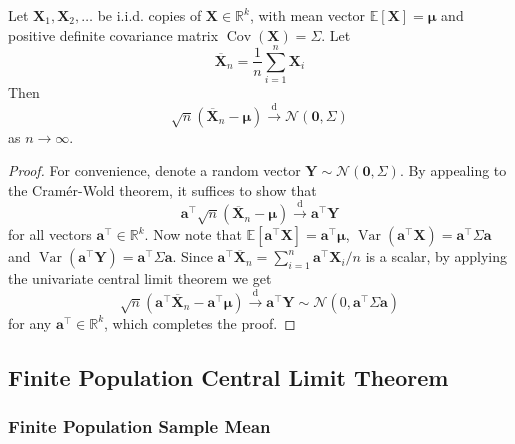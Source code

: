 \documentclass[11pt]{report} %
\begin{document}
Let $\mathbf{X}_{1}, \mathbf{X}_{2}, \dots$ be i.i.d. copies of $\mathbf{X} \in \mathbb{R}^{k}$, with mean vector $\mathbb{E}\left[\mathbf{X}\right] = \boldsymbol{\mu}$ and positive definite covariance matrix $\operatorname{Cov}\left(\mathbf{X}\right) = \Sigma$. Let
\begin{equation}
\overline{\mathbf{X}}_{n} = \dfrac{1}{n}\sum_{i = 1}^{n}\mathbf{X}_{i}
\end{equation}
Then
\begin{equation}
\sqrt{n}\left(\overline{\mathbf{X}}_{n} - \boldsymbol{\mu}\right) \overset{\mathrm{d}}{\to} \mathcal{N}\left(\mathbf{0}, \Sigma\right)
\end{equation}
as $n \to \infty$.
\begin{proof}
For convenience, denote a random vector $\mathbf{Y}\sim\mathcal{N}\left(\mathbf{0}, \Sigma\right)$. By appealing to the Cram\'{e}r-Wold theorem, it suffices to show that
\begin{equation}
\mathbf{a}^{\top}\sqrt{n}\left(\overline{\mathbf{X}}_{n} - \boldsymbol{\mu}\right) \overset{\mathrm{d}}{\to} \mathbf{a}^{\top}\mathbf{Y}
\end{equation}
for all vectors $\mathbf{a}^{\top} \in \mathbb{R}^{k}$. Now note that $\mathbb{E}\left[\mathbf{a}^{\top}\mathbf{X}\right] = \mathbf{a}^{\top}\boldsymbol{\mu}$, $\operatorname{Var}\left(\mathbf{a}^{\top}\mathbf{X}\right) = \mathbf{a}^{\top}\Sigma\mathbf{a}$ and $\operatorname{Var}\left(\mathbf{a}^{\top}\mathbf{Y}\right) = \mathbf{a}^{\top}\Sigma\mathbf{a}$. Since $\mathbf{a}^{\top}\overline{\mathbf{X}}_{n} = \sum_{i = 1}^{n}\mathbf{a}^{\top}\mathbf{X}_{i}/n$ is a scalar, by applying the univariate central limit theorem we get
\begin{equation}
\sqrt{n}\left(\mathbf{a}^{\top}\overline{\mathbf{X}}_{n} - \mathbf{a}^{\top}\boldsymbol{\mu}\right) \overset{\mathrm{d}}{\to} \mathbf{a}^{\top}\mathbf{Y} \sim \mathcal{N}\left(0, \mathbf{a}^{\top}\Sigma\mathbf{a}\right)
\end{equation}
for any $\mathbf{a}^{\top} \in \mathbb{R}^{k}$, which completes the proof.
\end{proof}

\subsection{Finite Population Central Limit Theorem}

\subsubsection{Finite Population Sample Mean}
\end{document}
